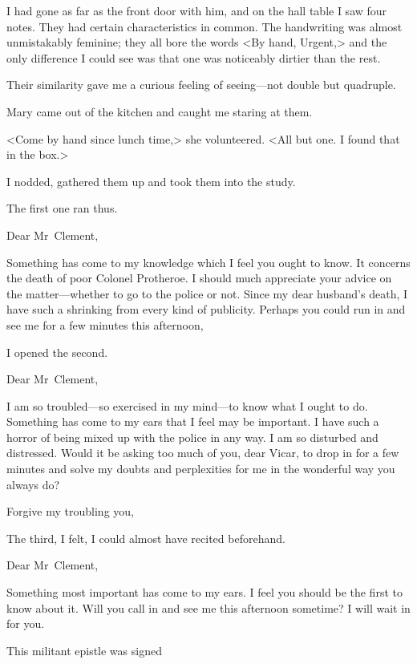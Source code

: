 I had gone as far as the front door with him, and on the hall table I saw four notes. They had certain characteristics in common. The handwriting was almost unmistakably feminine; they all bore the words <By hand, Urgent,> and the only difference I could see was that one was noticeably dirtier than the rest.

Their similarity gave me a curious feeling of seeing—not double but quadruple.

Mary came out of the kitchen and caught me staring at them.

<Come by hand since lunch time,> she volunteered. <All but one. I found that in the box.>

I nodded, gathered them up and took them into the study.

The first one ran thus.

\begin{mail}{}{Dear Mr~Clement,}

Something has come to my knowledge which I feel you ought to know. It concerns the death of poor Colonel Protheroe. I should much appreciate your advice on the matter—whether to go to the police or not. Since my dear husband's death, I have such a shrinking from every kind of publicity. Perhaps you could run in and see me for a few minutes this afternoon,

\end{mail}

I opened the second.

\begin{mail}{}{Dear Mr~Clement,}


I am so troubled—so exercised in my mind—to know what I ought to do. Something has come to my ears that I feel may be important. I have such a horror of being mixed up with the police in any way. I am so disturbed and distressed. Would it be asking too much of you, dear Vicar, to drop in for a few minutes and solve my doubts and perplexities for me in the wonderful way you always do?

Forgive my troubling you,


\end{mail}

The third, I felt, I could almost have recited beforehand.

\begin{mail}{}{Dear Mr~Clement,}

Something most important has come to my ears. I feel you should be the first to know about it. Will you call in and see me this afternoon sometime? I will wait in for you.
\pausemail

This militant epistle was signed
\resumemail

\end{mail}

